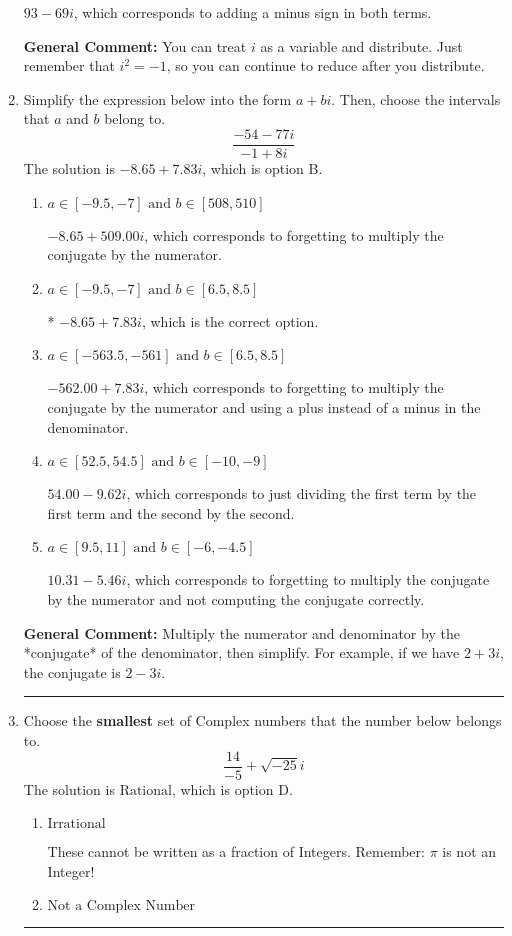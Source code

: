 \documentclass{extbook}[14pt]
\newcommand{\litem}[1]{\item #1

\rule{\textwidth}{0.4pt}}
\begin{document}
\begin{enumerate}
{\begin{enumerate}[label=\Alph*.]
 $93 - 69 i$, which corresponds to adding a minus sign in both terms.
\end{enumerate}

\textbf{General Comment:} You can treat $i$ as a variable and distribute. Just remember that $i^2=-1$, so you can continue to reduce after you distribute.
}
\litem{
Simplify the expression below into the form $a+bi$. Then, choose the intervals that $a$ and $b$ belong to.
\[ \frac{-54 - 77 i}{-1 + 8 i} \]
The solution is \( -8.65  + 7.83 i \), which is option B.\begin{enumerate}[label=\Alph*.]
\item \( a \in [-9.5, -7] \text{ and } b \in [508, 510] \)

 $-8.65  + 509.00 i$, which corresponds to forgetting to multiply the conjugate by the numerator.
\item \( a \in [-9.5, -7] \text{ and } b \in [6.5, 8.5] \)

* $-8.65  + 7.83 i$, which is the correct option.
\item \( a \in [-563.5, -561] \text{ and } b \in [6.5, 8.5] \)

 $-562.00  + 7.83 i$, which corresponds to forgetting to multiply the conjugate by the numerator and using a plus instead of a minus in the denominator.
\item \( a \in [52.5, 54.5] \text{ and } b \in [-10, -9] \)

 $54.00  - 9.62 i$, which corresponds to just dividing the first term by the first term and the second by the second.
\item \( a \in [9.5, 11] \text{ and } b \in [-6, -4.5] \)

 $10.31  - 5.46 i$, which corresponds to forgetting to multiply the conjugate by the numerator and not computing the conjugate correctly.
\end{enumerate}

\textbf{General Comment:} Multiply the numerator and denominator by the *conjugate* of the denominator, then simplify. For example, if we have $2+3i$, the conjugate is $2-3i$.
}
\litem{
Choose the \textbf{smallest} set of Complex numbers that the number below belongs to.
\[ \frac{14}{-5}+\sqrt{-25}i \]
The solution is \( \text{Rational} \), which is option D.\begin{enumerate}[label=\Alph*.]
\item \( \text{Irrational} \)

These cannot be written as a fraction of Integers. Remember: $\pi$ is not an Integer!
\item \( \text{Not a Complex Number} \)


\end{enumerate}}
\end{enumerate}
\end{document}
